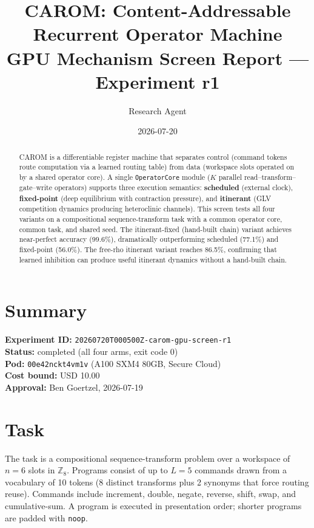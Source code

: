 \documentclass[11pt]{article}
\title{CAROM: Content-Addressable Recurrent Operator Machine \\
\large GPU Mechanism Screen Report --- Experiment r1}
\author{Research Agent}
\date{2026-07-20}
\begin{document}
\maketitle

\begin{abstract}
CAROM is a differentiable register machine that separates control (command tokens route computation via a learned routing table) from data (workspace slots operated on by a shared operator core). A single \texttt{OperatorCore} module ($K$ parallel read--transform--gate--write operators) supports three execution semantics: \textbf{scheduled} (external clock), \textbf{fixed-point} (deep equilibrium with contraction pressure), and \textbf{itinerant} (GLV competition dynamics producing heteroclinic channels). This screen tests all four variants on a compositional sequence-transform task with a common operator core, common task, and shared seed. The itinerant-fixed (hand-built chain) variant achieves near-perfect accuracy (99.6\%), dramatically outperforming scheduled (77.1\%) and fixed-point (56.0\%). The free-rho itinerant variant reaches 86.5\%, confirming that learned inhibition can produce useful itinerant dynamics without a hand-built chain.
\end{abstract}

\section{Summary}

\textbf{Experiment ID:} \texttt{20260720T000500Z-carom-gpu-screen-r1} \\
\textbf{Status:} completed (all four arms, exit code 0) \\
\textbf{Pod:} \texttt{00e42nckt4vm1v} (A100 SXM4 80GB, Secure Cloud) \\
\textbf{Cost bound:} USD 10.00 \\
\textbf{Approval:} Ben Goertzel, 2026-07-19

\section{Task}

The task is a compositional sequence-transform problem over a workspace of $n = 6$ slots in $\mathbb{Z}_8$. Programs consist of up to $L = 5$ commands drawn from a vocabulary of 10 tokens (8 distinct transforms plus 2 synonyms that force routing reuse). Commands include increment, double, negate, reverse, shift, swap, and cumulative-sum. A program is executed in presentation order; shorter programs are padded with \texttt{noop}.
\end{document}
